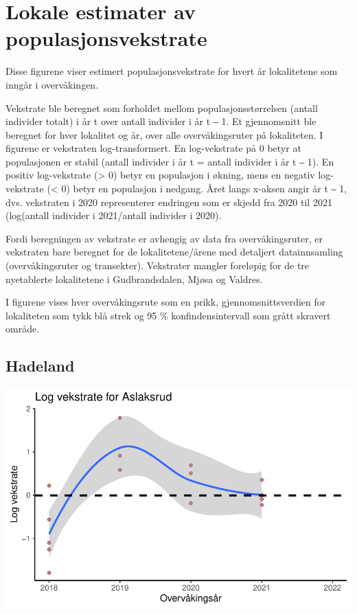 \documentclass[
  letterpaper,
  DIV=11,
  numbers=noendperiod]{scrreport}
\begin{document}

\hypertarget{lokale-estimater-av-populasjonsvekstrate}{%
\chapter{Lokale estimater av
populasjonsvekstrate}\label{lokale-estimater-av-populasjonsvekstrate}}

Disse figurene viser estimert populasjonsvekstrate for hvert år
lokalitetene som inngår i overvåkingen.

Vekstrate ble beregnet som forholdet mellom populasjonsstørrelsen
(antall individer totalt) i år t over antall individer i år t ‒ 1. Et
gjennomsnitt ble beregnet for hver lokalitet og år, over alle
overvåkingsruter på lokaliteten. I figurene er vekstraten
log-transformert. En log-vekstrate på 0 betyr at populasjonen er stabil
(antall individer i år t = antall individer i år t ‒ 1). En positiv
log-vekstrate (\textgreater{} 0) betyr en populasjon i økning, mens en
negativ log-vekstrate (\textless{} 0) betyr en populasjon i nedgang.
Året langs x-aksen angir år t ‒ 1, dvs. vekstraten i 2020 representerer
endringen som er skjedd fra 2020 til 2021 (log(antall individer i
2021/antall individer i 2020).

Fordi beregningen av vekstrate er avhengig av data fra overvåkingsruter,
er vekstraten bare beregnet for de lokalitetene/årene med detaljert
datainnsamling (overvåkingsruter og transekter). Vekstrater mangler
foreløpig for de tre nyetablerte lokalitetene i Gudbrandsdalen, Mjøsa og
Valdres.

I figurene vises hver overvåkingsrute som en prikk, gjennomsnittsverdien
for lokaliteten som tykk blå strek og 95 \% konfindensintervall som
grått skravert område.

\hypertarget{hadeland-1}{%
\section{Hadeland}\label{hadeland-1}}

\includegraphics{growthRate_files/figure-pdf/unnamed-chunk-3-1.pdf}
\end{document}
